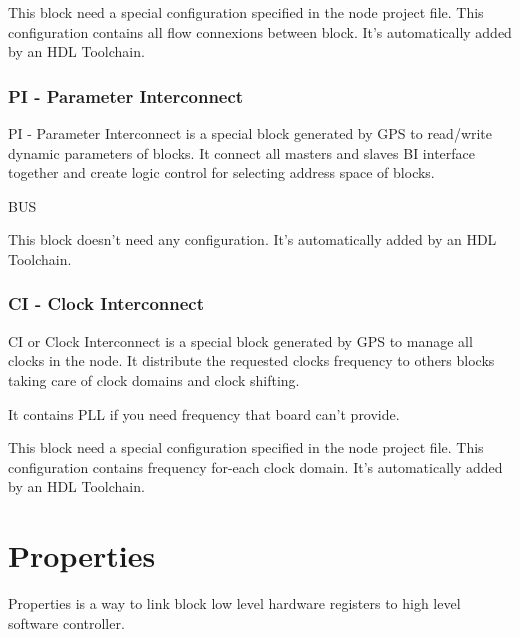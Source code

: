 This block need a special configuration specified in the node project file. This configuration contains all flow connexions between block. It's automatically added by an HDL Toolchain.

\subsubsection{PI - Parameter Interconnect}
PI - Parameter Interconnect is a special block generated by GPS to read/write dynamic parameters of blocks. It connect all masters and slaves BI interface together and create logic control for selecting address space of blocks.

BUS

This block doesn't need any configuration. It's automatically added by an HDL Toolchain.

\subsubsection{CI - Clock Interconnect}
CI or Clock Interconnect is a special block generated by GPS to manage all clocks in the node. It distribute the requested clocks frequency to others blocks taking care of clock domains and clock shifting.

It contains PLL if you need frequency that board can't provide.

This block need a special configuration specified in the node project file. This configuration contains frequency for-each clock domain. It's automatically added by an HDL Toolchain.


\section{Properties}
Properties is a way to link block low level hardware registers to high level software controller.
